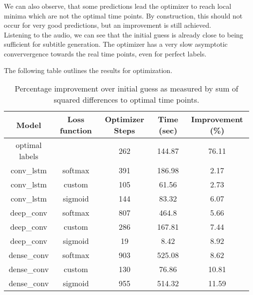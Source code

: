 We can also observe, that some predictions lead the optimizer to reach local minima which are not the optimal time points. By construction, this should not occur for very good predictions, but an improvement is still achieved.\\
Listening to the audio, we can see that the initial guess is already close to being sufficient for subtitle generation. The optimizer has a very slow asymptotic conververgence towards the real time points, even for perfect labels.


The following table outlines the results for optimization.

\FloatBarrier
\begin{table}[ht]
	\centering
	\begin{tabular}{ccccc}
		\toprule
		Model & Loss function & Optimizer Steps & Time (sec) & Improvement (\%)\\
		\midrule
		optimal labels &  & 262 & 144.87 & 76.11 \\
		conv\_lstm  & softmax  & 391 & 186.98 & 2.17 \\
		conv\_lstm  & custom   & 105 & 61.56 & 2.73 \\
		conv\_lstm  & sigmoid  & 144 & 83.32 & 6.07 \\
		deep\_conv  & softmax  & 807 & 464.8 & 5.66 \\
		deep\_conv  & custom   & 286 & 167.81 & 7.44 \\
		deep\_conv  & sigmoid  & 19 & 8.42 & 8.92 \\
		dense\_conv & softmax  & 903 & 525.08 & 8.62 \\
		dense\_conv & custom   & 130 & 76.86 & 10.81 \\
		dense\_conv & sigmoid  & 955 & 514.32 & 11.59 \\
		\bottomrule
	\end{tabular}
	\caption{Percentage improvement over initial guess as measured by sum of squared differences to optimal time points.}
\end{table}
\FloatBarrier










